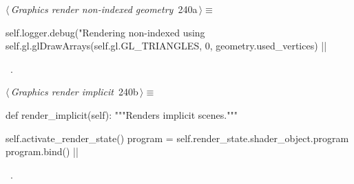 \documentclass[%
    a4paper,    %
    justified,  %
    nobib,      %
    openany     %
]{tufte-book}
\makeatletter
\renewcommand{\label}[1]{\@tufte@label{##1}}%
\makeatother
\begin{document}
\begin{fullwidth}
\begin{flushleft}
\begin{minipage}{\linewidth}
\begin{list}{}{\setlength{\itemsep}{-\parsep}\setlength{\itemindent}{-\leftmargin}}
\item{}
\end{list}
\end{minipage}\vspace{4ex}
\end{flushleft}
\begin{flushleft} \small
\begin{minipage}{\linewidth}\label{scrap258}\raggedright\small
{} $\langle\,${\itshape Graphics render non-indexed geometry}\nobreak\ {\footnotesize {240a}}$\,\rangle\equiv$
\vspace{-1ex}
\begin{pythoncode}
self.logger.debug("Rendering non-indexed using %
self.gl.glDrawArrays(self.gl.GL_TRIANGLES, 0, geometry.used_vertices)
|\NWsep|
\end{pythoncode}
\vspace{1.5ex}
\footnotesize
\begin{list}{}{\setlength{\itemsep}{-\parsep}\setlength{\itemindent}{-\leftmargin}}
\item \NWtxtMacroRefIn\ .

\item{}
\end{list}
\end{minipage}\vspace{4ex}
\end{flushleft}
\begin{flushleft} \small
\begin{minipage}{\linewidth}\label{scrap259}\raggedright\small
{} $\langle\,${\itshape Graphics render implicit}\nobreak\ {\footnotesize {240b}}$\,\rangle\equiv$
\vspace{-1ex}
\begin{pythoncode}
def render_implicit(self):
    """Renders implicit scenes."""

    self.activate_render_state()
    program = self.render_state.shader_object.program
    program.bind()
|\NWsep|
\end{pythoncode}
\vspace{1.5ex}
\footnotesize
\begin{list}{}{\setlength{\itemsep}{-\parsep}\setlength{\itemindent}{-\leftmargin}}
\item \NWtxtMacroRefIn\ .


\end{list}
\end{minipage}
\end{flushleft}
\end{fullwidth}
\end{document}
